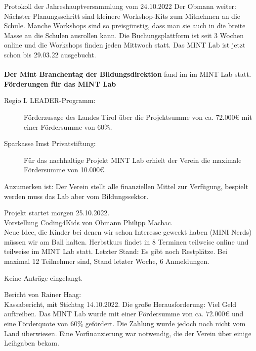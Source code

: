 \documentclass{scrartcl}
\newcommand\obmann{Philipp Machac}
\begin{document}
\begin{Minutes}{Protokoll der Jahreshauptversammlung vom 24.10.2022}
  Der Obmann weiter:\\
  Nächster Planungsschritt sind kleinere Workshop-Kits zum Mitnehmen an die Schule. Manche Workshops sind so preisgünstig, dass man sie auch in die breite Masse an die Schulen ausrollen kann.
  Die Buchungsplattform ist seit 3 Wochen online und die Workshops finden jeden Mittwoch statt. Das MINT Lab ist jetzt schon bis 29.03.22 ausgebucht. \\\\ \textbf{Der Mint Branchentag der Bildungsdirektion} fand im im MINT Lab statt.\\

  \textbf{Förderungen für das MINT Lab}

  \begin{description}
    \item [Regio L LEADER-Programm:] Förderzusage des Landes Tirol über die Projektsumme von ca. 72.000€ mit einer Fördersumme von 60\%.
    \item [Sparkasse Imst Privatstiftung:] Für das nachhaltige Projekt MINT Lab erhielt der Verein die maximale Fördersumme von 10.000€.
  \end{description}

  Anzumerken ist: Der Verein stellt alle finanziellen Mittel zur Verfügung, bespielt werden muss das Lab aber vom Bildungssektor.

  Projekt startet morgen 25.10.2022.\\
  Vorstellung Coding4Kids von Obmann \obmann.\\
  Neue Idee, die Kinder bei denen wir schon Interesse geweckt haben (\glqq MINI Nerds\grqq{}) m\"ussen wir am Ball halten. Herbstkurs findet in 8 Terminen teilweise online und teilweise im MINT Lab statt.
  Letzter Stand: Es gibt noch Restplätze. Bei maximal 12 Teilnehmer sind, Stand letzter Woche, 6 Anmeldungen.


  Keine Anträge eingelangt.

  Bericht von Rainer Haag:\\
  Kassabericht, mit Stichtag 14.10.2022. Die große Herausforderung: Viel Geld auftreiben. Das MINT Lab wurde mit einer Fördersumme von ca. 72.000€ und eine Förderquote von 60\% gefördert.
  Die Zahlung wurde jedoch noch nicht vom Land überwiesen.
  Eine Vorfinanzierung war notwendig, die der Verein über einige Leihgaben bekam.


\end{Minutes}
\end{document}
